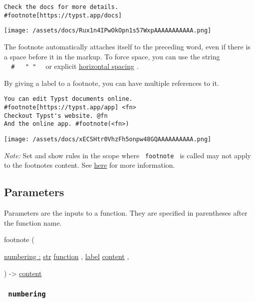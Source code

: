 \begin{verbatim}
Check the docs for more details.
#footnote[https://typst.app/docs]
\end{verbatim}

\texttt{[image: /assets/docs/Rux1n4IPwOkOpn1s57WxpAAAAAAAAAAA.png]}

The footnote automatically attaches itself to the preceding word, even
if there is a space before it in the markup. To force space, you can use
the string
\texttt{\ }{\texttt{\ \#\ }}\texttt{\ }{\texttt{\ "\ "\ }}\texttt{\ } or
explicit \href{/docs/reference/layout/h/}{horizontal spacing} .

By giving a label to a footnote, you can have multiple references to it.

\begin{verbatim}
You can edit Typst documents online.
#footnote[https://typst.app/app] <fn>
Checkout Typst's website. @fn
And the online app. #footnote(<fn>)
\end{verbatim}

\texttt{[image: /assets/docs/xECSHtr0VhzFh5onpw48GQAAAAAAAAAA.png]}

\emph{Note:} Set and show rules in the scope where \texttt{\ footnote\ }
is called may not apply to the footnote\textquotesingle s content. See
\href{https://github.com/typst/typst/issues/1467\#issuecomment-1588799440}{here}
for more information.

\subsection{\texorpdfstring{{ Parameters
}}{ Parameters }}\label{parameters}

\label{parameters-tooltip}
Parameters are the inputs to a function. They are specified in
parentheses after the function name.

{ footnote } (

{ \hyperref[parameters-numbering]{numbering :}
\href{/docs/reference/foundations/str/}{str}
\href{/docs/reference/foundations/function/}{function} , } {
\href{/docs/reference/foundations/label/}{label}
\href{/docs/reference/foundations/content/}{content} , }

) -\textgreater{} \href{/docs/reference/foundations/content/}{content}

\subsubsection{\texorpdfstring{\texttt{\ numbering\ }}{ numbering }}\label{parameters-numbering}

